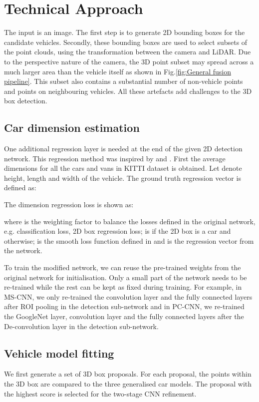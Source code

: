\documentclass[letterpaper, 10 pt, conference]{ieeeconf}  \usepackage[
\begin{document}
\section{Technical Approach}
The input is an image. The first step is to generate 2D bounding boxes for the candidate vehicles. Secondly, these bounding boxes are used to select subsets of the point clouds, using the transformation between the camera and LiDAR. Due to the perspective nature of the camera, the 3D point subset may spread across a much larger area than the vehicle itself as shown in Fig.\ref{fig:General fusion pipeline}. This subset also contains a substantial number of non-vehicle points and points on neighbouring vehicles. All these artefacts add challenges to the 3D box detection.

\subsection{Car dimension estimation}
One additional regression layer is needed at the end of the given 2D detection network. This regression method was inspired by \cite{deepmanta_cvpr17} and \cite{mousavian20163d}. First the average dimensions for all the cars and vans in KITTI dataset is obtained. Let  denote height, length and width of the vehicle. The ground truth regression vector  is defined as:


The dimension regression loss is shown as:

where  is the weighting factor to balance the losses defined in the original network, e.g. classification loss, 2D box regression loss;  is  if the 2D box is a car and  otherwise;  is the smooth  loss function defined in \cite{girshick2015fast} and  is the regression vector from the network.

To train the modified network, we can reuse the pre-trained weights from the original network for initialisation. Only a small part of the network needs to be re-trained while the rest can be kept as fixed during training. For example, in MS-CNN, we only re-trained the convolution layer and the fully connected layers after ROI pooling in the detection sub-network and in PC-CNN, we re-trained the GoogleNet layer, convolution layer and the fully connected layers after the De-convolution layer in the detection sub-network.

\subsection{Vehicle model fitting}
We first generate a set of 3D box proposals. For each proposal, the points within the 3D box are compared to the three generalised car models. The proposal with the highest score is selected for the two-stage CNN refinement.
\end{document}
